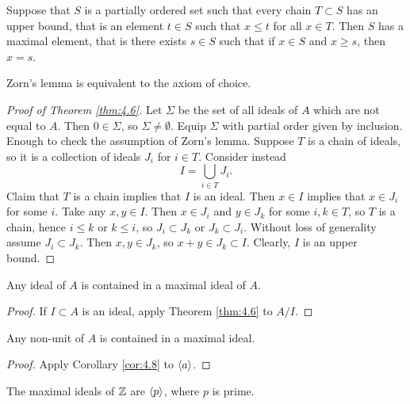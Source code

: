 \begin{lemma}[Zorn]
Suppose that $ S $ is a partially ordered set such that every chain $ T \subset S $ has an upper bound, that is an element $ t \in S $ such that $ x \le t $ for all $ x \in T $. Then $ S $ has a maximal element, that is there exists $ s \in S $ such that if $ x \in S $ and $ x \ge s $, then $ x = s $.
\end{lemma}

Zorn's lemma is equivalent to the axiom of choice.

\begin{proof}[Proof of Theorem \ref{thm:4.6}]
Let $ \Sigma $ be the set of all ideals of $ A $ which are not equal to $ A $. Then $ 0 \in \Sigma $, so $ \Sigma \ne \emptyset $. Equip $ \Sigma $ with partial order given by inclusion. Enough to check the assumption of Zorn's lemma. Suppose $ T $ is a chain of ideals, so it is a collection of ideals $ J_i $ for $ i \in T $. Consider instead
$$ I = \bigcup_{i \in T} J_i. $$
Claim that $ T $ is a chain implies that $ I $ is an ideal. Then $ x \in I $ implies that $ x \in J_i $ for some $ i $. Take any $ x, y \in I $. Then $ x \in J_i $ and $ y \in J_k $ for some $ i, k \in T $, so $ T $ is a chain, hence $ i \le k $ or $ k \le i $, so $ J_i \subset J_k $ or $ J_k \subset J_i $. Without loss of generality assume $ J_i \subset J_k $. Then $ x, y \in J_k $, so $ x + y \in J_k \subset I $. Clearly, $ I $ is an upper bound.
\end{proof}

\pagebreak

\begin{corollary}
\label{cor:4.8}
Any ideal of $ A $ is contained in a maximal ideal of $ A $.
\end{corollary}

\begin{proof}
If $ I \subset A $ is an ideal, apply Theorem \ref{thm:4.6} to $ A / I $.
\end{proof}

\begin{corollary}
\label{cor:4.9}
Any non-unit of $ A $ is contained in a maximal ideal.
\end{corollary}

\begin{proof}
Apply Corollary \ref{cor:4.8} to $ \left\langle a \right\rangle $.
\end{proof}

\begin{example*}
The maximal ideals of $ \mathbb{Z} $ are $ \left\langle p \right\rangle $, where $ p $ is prime.
\end{example*}

